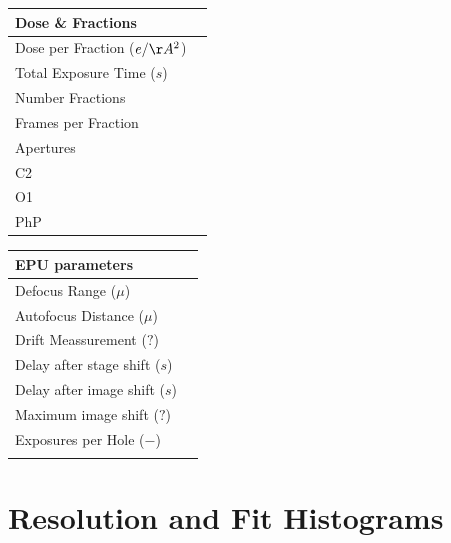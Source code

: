 \documentclass[12pt,a4paper]{article}
\begin{document}
   \newline
%
\begin{tabulary}{\linewidth}{L L}
  \\\hline
  Dose \& Fractions &  \\\hline
  Dose per Fraction ($e/\AA^2$) & 
       \\\hline
  Total Exposure Time ($s$)& 
       \\\hline
  Number Fractions & 
       \\\hline
  Frames per Fraction & 
      \\\hline
  Apertures &  \\\hline
  C2  &  \\\hline
  O1  &  \\\hline
  PhP &  \\\hline
\end{tabulary}
%
  \hspace{1cm}
%
\begin{tabulary}{\linewidth}{L L}
  \\\hline
  EPU parameters &  \\\hline
  Defocus Range ($\mu$)&  \\\hline
  Autofocus Distance ($\mu$) & 
       \\\hline
  Drift Meassurement ($?$) & 
       \\\hline
  Delay after stage shift ($s$) & 
       \\\hline
  Delay after image shift ($s$) &
       \\\hline
  Maximum image shift ($?$) &
       \\\hline
  Exposures per Hole ($-$)& 
       \\\hline
      &\\
\end{tabulary}

\newpage\thispagestyle{empty}
\section*{Resolution and Fit Histograms}
\end{document}
